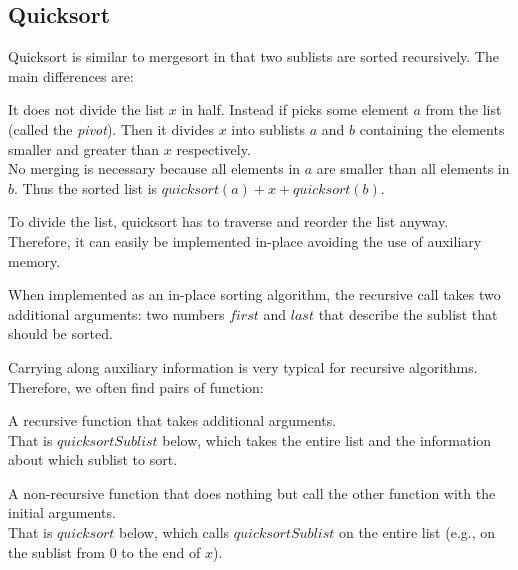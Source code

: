 \subsection{Quicksort}

Quicksort is similar to mergesort in that two sublists are sorted recursively.
The main differences are:
\begin{compactitem}
 \item It does not divide the list $x$ in half.
  Instead if picks some element $a$ from the list (called the \emph{pivot}).
  Then it divides $x$ into sublists $a$ and $b$ containing the elements smaller and greater than $x$ respectively.\\
  No merging is necessary because all elements in $a$ are smaller than all elements in $b$.
  Thus the sorted list is $quicksort(a)+x+quicksort(b)$.
 \item To divide the list, quicksort has to traverse and reorder the list anyway.
 Therefore, it can easily be implemented in-place avoiding the use of auxiliary memory.
\end{compactitem}

When implemented as an in-place sorting algorithm, the recursive call takes two additional arguments: two numbers $first$ and $last$ that describe the sublist that should be sorted.

\begin{remark}
Carrying along auxiliary information is very typical for recursive algorithms.
Therefore, we often find pairs of function:
 \begin{compactitem}
  \item A recursive function that takes additional arguments.\\
   That is $quicksortSublist$ below, which takes the entire list and the information about which sublist to sort.
  \item A non-recursive function that does nothing but call the other function with the initial arguments.\\
   That is $quicksort$ below, which calls $quicksortSublist$ on the entire list (e.g., on the sublist from $0$ to the end of $x$).
 \end{compactitem}
\end{remark}


